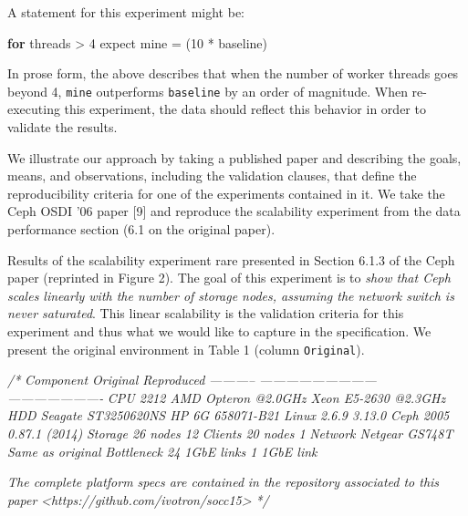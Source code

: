 \documentclass[10pt,reprint]{sigplanconf}
\newenvironment{Shaded}{\begin{snugshade}}{\end{snugshade}}
\newcommand{\KeywordTok}[1]{\textcolor[rgb]{0.13,0.29,0.53}{\textbf{{#1}}}}
\newcommand{\DecValTok}[1]{\textcolor[rgb]{0.00,0.00,0.81}{{#1}}}
\newcommand{\CommentTok}[1]{\textcolor[rgb]{0.56,0.35,0.01}{\textit{{#1}}}}
\newcommand{\NormalTok}[1]{{#1}}
\begin{document}
A statement for this experiment might be:

\begin{Shaded}
\begin{Highlighting}[]
  \KeywordTok{for}    \NormalTok{threads > }\DecValTok{4}
  \NormalTok{expect mine = (}\DecValTok{10} \NormalTok{* baseline)}
\end{Highlighting}
\end{Shaded}

In prose form, the above describes that when the number of worker
threads goes beyond 4, \texttt{mine} outperforms \texttt{baseline} by an
order of magnitude. When re-executing this experiment, the data should
reflect this behavior in order to validate the results.


We illustrate our approach by taking a published paper and describing
the goals, means, and observations, including the validation clauses,
that define the reproducibility criteria for one of the experiments
contained in it. We take the Ceph OSDI '06 paper {[}9{]} and reproduce
the scalability experiment from the data performance section (6.1 on the
original paper).

Results of the scalability experiment rare presented in Section 6.1.3 of
the Ceph paper (reprinted in Figure 2). The goal of this experiment is
to \emph{show that Ceph scales linearly with the number of storage
nodes, assuming the network switch is never saturated}. This linear
scalability is the validation criteria for this experiment and thus what
we would like to capture in the specification. We present the original
environment in Table 1 (column \texttt{Original}).

\begin{Shaded}
\begin{Highlighting}[]
\CommentTok{/*}
\CommentTok{ Component   Original                    Reproduced}
\CommentTok{----------- --------------------------- ----------------------}
\CommentTok{ CPU          2212 AMD Opteron @2.0GHz   Xeon E5-2630 @2.3GHz}
\CommentTok{ HDD          Seagate ST3250620NS        HP 6G 658071-B21}
\CommentTok{ Linux        2.6.9                      3.13.0}
\CommentTok{ Ceph         2005                       0.87.1 (2014)}
\CommentTok{ Storage      26 nodes                   12}
\CommentTok{ Clients      20 nodes                   1}
\CommentTok{ Network      Netgear GS748T             Same as original}
\CommentTok{ Bottleneck   24 1GbE links              1 1GbE link}

\CommentTok{The complete platform specs are contained}
\CommentTok{in the repository associated to this paper }
\CommentTok{<https://github.com/ivotron/socc15>}
\CommentTok{*/}
\end{Highlighting}
\end{Shaded}
\end{document}
